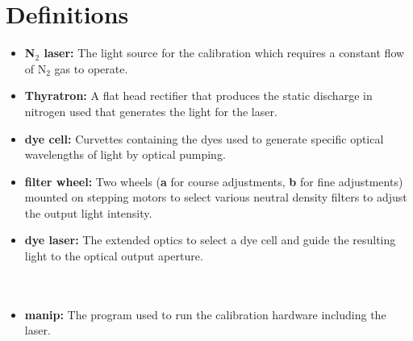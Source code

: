 \section{Definitions}
\begin{itemize}
\item {\bf N$_{2}$ laser:} The light source for the calibration which requires a constant flow of N$_{2}$ gas to operate.
\item {\bf Thyratron:} A flat head rectifier that produces the static discharge in nitrogen used that generates the light for the laser.
\item {\bf dye cell:} Curvettes containing the dyes used to generate specific optical wavelengths of light by optical pumping. 
\item {\bf filter wheel:} Two wheels ({\bf a} for course adjustments, {\bf b} for fine adjustments) mounted on stepping motors to select various neutral density filters to adjust the output light intensity.
\item {\bf dye laser:} The extended optics to select a dye cell and guide the resulting light to the optical output aperture.\\ \\ \\
\item {\bf manip:} The program used to run the calibration hardware including the laser.\\ 
\end{itemize}
